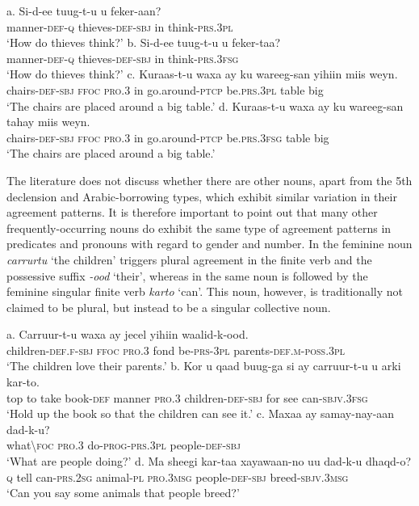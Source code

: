 \documentclass[output=paper]{langsci/langscibook}
\begin{document}
\ea
\ea
\gll a. Si-d-ee             tuug-t-u             u  feker-aan?\\
       manner-\textsc{def-q} thieves-\textsc{def-sbj} in think-\textsc{prs.3pl}\\
\glt ‘How do thieves think?’
\ex
\gll b. Si-d-ee             tuug-t-u             u  feker-taa?\\
       manner-\textsc{def-q} thieves-\textsc{def-sbj} in think-\textsc{prs.3fsg}\\
\glt ‘How do thieves think?’
\ex
\gll c. Kuraas-t-u      waxa  ay     ku wareeg-san       yihiin         miis weyn.\\
       chairs-\textsc{def-sbj ffoc pro.3} in go.around\textsc{{}-ptcp }be\textsc{.prs.3pl} table big\\
\glt ‘The chairs are placed around a big table.’ 
\ex
\gll d. Kuraas-t-u      waxa  ay     ku wareeg-san       tahay           miis weyn.\\
       chairs-\textsc{def-sbj ffoc pro.3} in go.around\textsc{{}-ptcp }be\textsc{.prs.3fsg} table big\\
\glt ‘The chairs are placed around a big table.’ 
\z
\z

The literature does not discuss whether there are other nouns, apart from the 5th declension and Arabic-borrowing types, which exhibit similar variation in their agreement patterns. It is therefore important to point out that many other frequently-occurring nouns do exhibit the same type of agreement patterns in predicates and pronouns with regard to gender and number. In  the feminine noun \textit{carrurtu} ‘the children’ triggers plural agreement in the finite verb and the possessive suffix \textit{{}-ood} ‘their’, whereas in  the same noun is followed by the feminine singular finite verb \textit{karto} ‘can’. This noun, however, is traditionally not claimed to be plural, but instead to be a singular collective noun.

\ea
\ea
\gll a. Carruur-t-u          waxa ay      jecel  yihiin           waalid-k-ood.\\
       children-\textsc{def.f-sbj ffoc pro.3 }fond  be\textsc{{}-prs-3pl} parents-\textsc{def.m}{}-\textsc{poss.3pl}\\
\glt ‘The children love their parents.’
\ex
\gll b. Kor u qaad buug-ga  si          ay      carruur-t-u          u   arki kar-to.\\
     top to take book-\textsc{def} manner \textsc{pro.3} children-\textsc{def-sbj} for see can-\textsc{sbjv.3fsg}\\
\glt ‘Hold up the book so that the children can see it.’
\ex
\gll c. Maxaa     ay          samay-nay-aan     dad-k-u?\\
       what{\textbackslash}\textsc{foc pro.3}  do-\textsc{prog-prs.3pl}  people\textsc{{}-def-sbj}\\
\glt ‘What are people doing?’
\ex
\gll d. Ma sheegi kar-taa         xayawaan-no  uu        dad-k-u             dhaqd-o?\\
       \textsc{q}     tell     can-\textsc{prs.2sg} animal\textsc{{}-pl  pro.3msg}  people\textsc{{}-def-sbj} breed-\textsc{sbjv.3msg}\\
\glt ‘Can you say some animals that people breed?’
\z
\z
\end{document}
